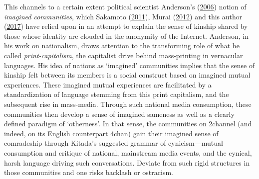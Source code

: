\documentclass[10pt,british,A4paper,,openany]{memoir}
\begin{document}
This channels to a certain extent political scientist Anderson's
(\protect\hyperlink{ref-anderson_imagined_2006}{2006}) notion of
\emph{imagined communities}, which Sakamoto
(\protect\hyperlink{ref-sakamoto_koreans_2011}{2011}), Murai
(\protect\hyperlink{ref-murai_net_2012}{2012}) and this author
(\protect\hyperlink{ref-poppe_digitaal_2017}{2017}) have relied upon in
an attempt to explain the sense of kinship shared by those whose
identity are clouded in the anonymity of the Internet. Anderson, in his
work on nationalism, draws attention to the transforming role of what he
called \emph{print-capitalism}, the capitalist drive behind
mass-printing in vernacular languages. His idea of nations as `imagined'
communities implies that the sense of kinship felt between its members
is a social construct based on imagined mutual experiences. These
imagined mutual experiences are facilitated by a standardization of
language stemming from this print capitalism, and the subsequent rise in
mass-media. Through such national media consumption, these communities
then develop a sense of imagined sameness as well as a clearly defined
paradigm of `otherness'. In that sense, the communities on 2channel (and
indeed, on its English counterpart 4chan) gain their imagined sense of
comradeship through Kitada's suggested grammar of cynicism---mutual
consumption and critique of national, mainstream media events, and the
cynical, harsh language driving such conversations. Deviate from such
rigid structures in those communities and one risks backlash or
ostracism.
\end{document}
